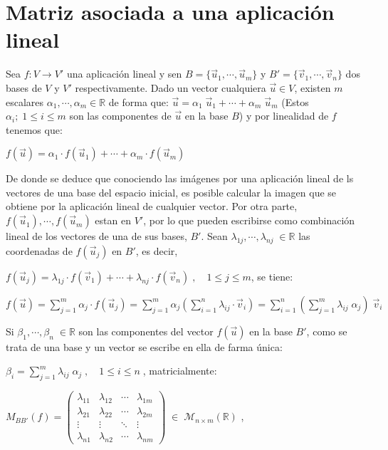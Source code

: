 \section{Matriz asociada a una aplicación lineal}

Sea $f:V\to V'$ una aplicación lineal y sen $B=\{ \vec u_1, \cdots, \vec u_m \} $ y $B'=\{ \vec v_1, \cdots, \vec v_n \} $ dos bases de $V$ y $V'$ respectivamente. Dado un vector cualquiera $\vec u\in V$, existen $m$ escalares $\alpha_1, \cdots, \alpha_m \in \mathbb R$ de forma que: $\vec u = \alpha_1\; \vec u_1 + \cdots + \alpha_m\; \vec u_m$ \textcolor{gris}{(Estos $\alpha_i; \; 1\le i \le m$ son las componentes de $\vec u$ en la base $B$)} y por linealidad de $f$ tenemos que: 

$f(\vec u)=\alpha_1\cdot f(\vec u_1) + \cdots + \alpha_m\cdot f(\vec u_m)$

De donde se deduce que conociendo las imágenes por una aplicación lineal de ls vectores de una base del espacio inicial, es posible calcular la imagen que se obtiene por la aplicación lineal de cualquier vector. Por otra parte, $f(\vec u_1), \cdots, f(\vec u_m)$ estan en $V'$, por lo que pueden escribirse como combinación lineal de los vectores de una de sus bases, $B'$. Sean $\lambda_{1j}, \cdots, \lambda_{nj}\; \in \mathbb R$ las coordenadas de $f(\vec u_j)$ en $B'$, es decir,

$f(\vec u_j)=\lambda_{1j}\cdot f(\vec v_1) + \cdots + \lambda_{nj}\cdot f(\vec v_n)\; , \quad 1\le j \le m$, se tiene:

$\displaystyle f(\vec u)= \sum_{j=1}^m \alpha_{j}\cdot f(\vec u_j)=\sum_{j=1}^m \alpha_j \left( \sum_{i=1}^n \lambda_{ij}\cdot \vec v_i \right)=\sum_{i=1}^n \left( \sum_{j=1}^m \lambda_{ij} \; \alpha_j \right) \; \vec v_i$
 
 Si $\beta_1, \cdots, \beta_n\; \in \mathbb R$ son las componentes del vector $f(\vec u)$ en la base $B'$, como se trata de una base y un vector se escribe en ella de farma única:
 
 $\displaystyle \beta_i=\sum_{j=1}^m \lambda_{ij} \; \alpha_j \; , \quad 1\le i \le n\; $, matricialmente:
 
 $M_{BB'}(f)= \left(  \begin{matrix}  \lambda_{11} &  \lambda_{12}& \cdots &  \lambda_{1m} \\  \lambda_{21}& \lambda_{22}&\cdots & \lambda_{2m}\\ \vdots & \vdots & \ddots & \vdots \\  \lambda_{n1}& \lambda_{n2}&\cdots&  \lambda_{nm} \end{matrix}  \right)\; \in\; \mathcal M_{n \times m} (\mathbb R)$ , 
 
